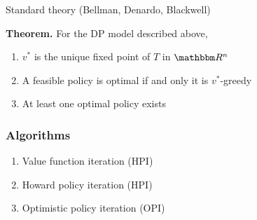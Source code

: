 \documentclass[xcolor=dvipsnames]{beamer}
\newcommand{\RR}{\mathbbm R}
\newcommand{\1}{\mathbbm 1}
\begin{document}
\begin{frame}\label{slide:mdp_result}

    Standard theory (Bellman, Denardo, Blackwell)

        \vspace{0.5em}
        \vspace{0.5em}
    \begin{block}{}
        {\bf Theorem.} For the DP model described above,
        \vspace{0.5em}
        \begin{enumerate}
            \item $v^*$ is the unique fixed point of $T$
                in $\RR^n$
            \vspace{0.5em}
            \vspace{0.5em}
            \item A feasible policy is optimal if and only it is
                $v^*$-greedy
            \vspace{0.5em}
            \vspace{0.5em}
            \item At least one optimal policy exists
        \end{enumerate}
    \end{block}



\end{frame}


\begin{frame}
    \frametitle{Algorithms}


    \begin{enumerate}
        \item Value function iteration (HPI)
        \vspace{0.5em}
        \item Howard policy iteration (HPI) 
        \vspace{0.5em}
        \item Optimistic policy iteration (OPI)
    \end{enumerate}


\end{frame}
\end{document}
